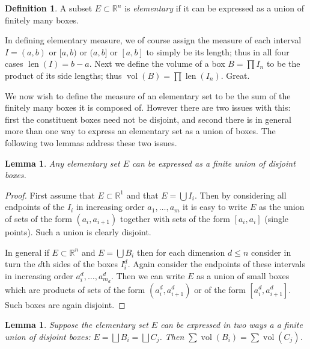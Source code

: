 \documentclass[11pt,oneside]{amsbook}
\newcommand{\RR}{{\mathbb R}}
\DeclareMathOperator{\len}{len}
\DeclareMathOperator{\vol}{vol}
\theoremstyle{definition}
\theoremstyle{plain}
\newtheorem{lem}[thm]{Lemma}
\theoremstyle{definition}
\newtheorem{defn}[thm]{Definition}
\theoremstyle{remark}
\numberwithin{equation}{section}
\numberwithin{figure}{section}
\begin{document}
\begin{defn}
  A subset $E\subset\RR^n$ is \emph{elementary} if it can be expressed as a union of finitely many boxes.
\end{defn}

In defining elementary measure, we of course assign the measure of each interval $I=(a,b)$ or $[a,b)$ or $(a,b]$ or $[a,b]$ to simply be its length; thus in all four cases $\len(I)=b-a$. Next we define the volume of a box $B=\prod I_n$ to be the product of its side lengths; thus $\vol(B)=\prod\len(I_n)$. Great.

We now wish to define the measure of an elementary set to be the sum of the finitely many boxes it is composed of. However there are two issues with this: first the constituent boxes need not be disjoint, and second there is in general more than one way to express an elementary set as a union of boxes. The following two lemmas address these two issues.

\begin{lem}
  Any elementary set $E$ can be expressed as a finite union of disjoint boxes.
\end{lem}

\begin{proof}
  First assume that $E\subset\RR^1$ and that $E=\bigcup I_i$. Then by considering all endpoints of the $I_i$ in increasing order $a_1,\ldots,a_m$ it is easy to write $E$ as the union of sets of the form $(a_i,a_{i+1})$ together with sets of the form $[a_i,a_i]$ (single points). Such a union is clearly disjoint.

  In general if $E\subset\RR^n$ and $E=\bigcup B_i$ then for each dimension $d\leq n$ consider in turn the $d$th sides of the boxes $I_i^d$. Again consider the endpoints of these intervals in increasing order $a_i^d,\ldots,a_{m_d}^d$. Then we can write $E$ as a union of small boxes which are products of sets of the form $(a_i^d,a_{i+1}^d)$ or of the form $[a_i^d,a_{i+1}^d]$. Such boxes are again disjoint.
\end{proof}

\begin{lem}
  Suppose the elementary set $E$ can be expressed in two ways a a finite union of disjoint boxes: $E=\bigsqcup B_i=\bigsqcup C_j$. Then $\sum\vol(B_i)=\sum\vol(C_j)$.
\end{lem}
\end{document}
